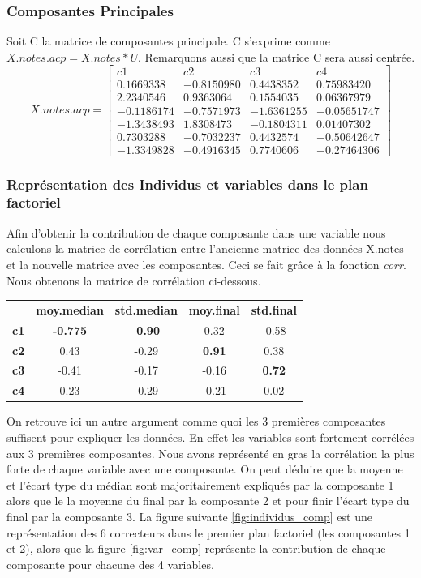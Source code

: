 \documentclass[10pt]{article}
\begin{document}
	\subsubsection{Composantes Principales}
	Soit C la matrice  de composantes principale. C s'exprime comme $X.notes.acp = X.notes * U$. Remarquons aussi que la matrice C sera aussi centrée.
	\[
	X.notes.acp=
	\begin{bmatrix}
	c1	& c2	& c3 &	c4\\
	0.1669338 &	-0.8150980	& 0.4438352	& 0.75983420\\
	2.2340546	& 0.9363064	& 0.1554035	& 0.06367979\\
	-0.1186174 &	-0.7571973	& -1.6361255	& -0.05651747\\
	-1.3438493 &	1.8308473 &	-0.1804311 &	0.01407302\\
	0.7303288 &	-0.7032237 &	0.4432574 &	-0.50642647\\
	-1.3349828	& -0.4916345 &	0.7740606 &	-0.27464306
	\end{bmatrix}
	\]
	
	\subsubsection{Représentation des Individus  et variables dans le plan factoriel}
	Afin d'obtenir la contribution de chaque composante dans une variable nous calculons la matrice de corrélation entre l'ancienne matrice des données X.notes et la nouvelle matrice avec les composantes. Ceci se fait grâce à la fonction \textit{corr}. Nous obtenons la matrice de corrélation ci-dessous.\\
	\begin{center}
		\begin{tabular}{c c c c c}
			&	\textbf{moy.median}	&	 \textbf{std.median} &		\textbf{moy.final}	&	\textbf{ std.final}\\
			\textbf{c1}	&	\textbf{-0.775} &		-\textbf{0.90}	&	0.32	&	-0.58\\
			\textbf{c2}	&	0.43 &		-0.29	&\textbf{	0.91}	&	0.38\\
			\textbf{c3}	&	-0.41	&	-0.17	&	-0.16	&	\textbf{0.72}\\
			\textbf{c4}	&	0.23 &		-0.29 &		-0.21	&	0.02
		\end{tabular}
	\end{center}
	On retrouve ici un autre argument comme quoi les 3 premières composantes suffisent pour expliquer les données. En effet les variables sont fortement corrélées aux 3 premières composantes. Nous avons représenté en gras la corrélation la plus forte de chaque variable avec une composante. On peut déduire que la moyenne et l'écart type du médian sont majoritairement expliqués par la composante 1 alors que le la moyenne du final par la composante 2 et pour finir l'écart type du final par la composante 3. La figure suivante \ref{fig:individus_comp}	est une représentation des 6 correcteurs dans le premier plan factoriel (les composantes 1 et 2), alors que la figure \ref{fig:var_comp} représente la contribution de chaque composante pour chacune des 4 variables.
	
\end{document}
